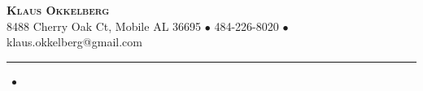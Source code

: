 \documentclass[11pt]{extarticle}
\begin{document}
\begin{center}
    {\fontsize{28}{33}\selectfont \textbf{\textsc{Klaus Okkelberg}}} \\[2pt]
    8488 Cherry Oak Ct, Mobile AL 36695 $\bullet$ 484-226-8020 $\bullet$ klaus.okkelberg@gmail.com \\[0pt]
    \vspace*{-5pt}
    \rule{\textwidth}{0.2pt}
\end{center}

\vspace*{-5pt}
\begin{itemize}[itemsep=0pt]
\item[] 
\end{itemize}
\vspace{-6pt}
\end{document}
